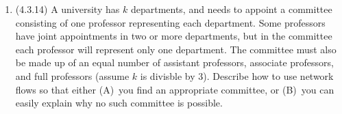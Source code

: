 \documentclass[11pt]{amsart}%
\begin{document}
\begin{enumerate}
\item (4.3.14) A university has $k$ departments, and needs to appoint a committee consisting of one professor representing each department.  Some professors have joint appointments in two or more departments, but in the committee each professor will represent only one department.  The committee must also be made up of an equal number of assistant professors, associate professors, and full professors (assume $k$ is divisble by 3).  Describe how to use network flows so that either (A)~you find an appropriate committee, or (B)~you can easily explain why no such committee is possible.

\end{enumerate}
\end{document}
